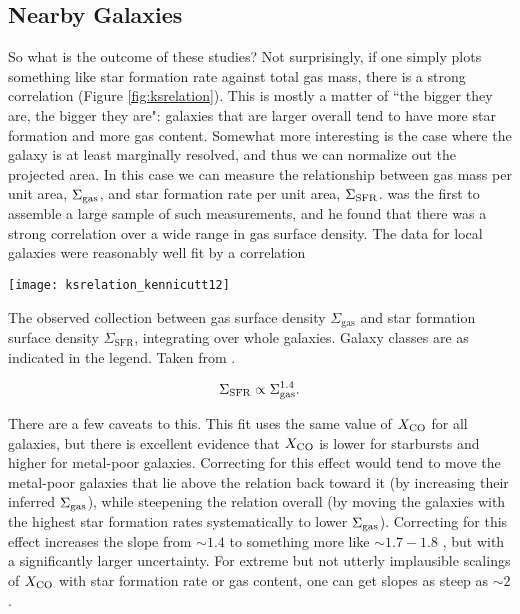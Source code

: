 \subsection{Nearby Galaxies}

So what is the outcome of these studies? Not surprisingly, if one simply plots something like star formation rate against total gas mass, there is a strong correlation (Figure \ref{fig:ksrelation}). This is mostly a matter of ``the bigger they are, the bigger they are": galaxies that are larger overall tend to have more star formation and more gas content. Somewhat more interesting is the case where the galaxy is at least marginally resolved, and thus we can normalize out the projected area. In this case we can measure the relationship between gas mass per unit area, $\Sigma_{\rm gas}$, and star formation rate per unit area, $\Sigma_{\rm SFR}$. \citet{kennicutt98a} was the first to assemble a large sample of such measurements, and he found that there was a strong correlation over a wide range in gas surface density. The data for local galaxies were reasonably well fit by a correlation
\begin{marginfigure}
\texttt{[image: ksrelation\_kennicutt12]}
\caption[Whole-galaxy Kennicutt-Schmidt relation]{
\label{fig:ksrelation}
The observed collection between gas surface density $\Sigma_{\mathrm{gas}}$ and star formation surface density $\Sigma_{\mathrm{SFR}}$, integrating over whole galaxies. Galaxy classes are as indicated in the legend. Taken from \citet{kennicutt12a}.
}
\end{marginfigure}

\begin{equation}
\Sigma_{\rm SFR} \propto \Sigma_{\rm gas}^{1.4}.
\end{equation}

There are a few caveats to this. This fit uses the same value of $X_{\rm CO}$ for all galaxies, but there is excellent evidence that $X_{\rm CO}$ is lower for starbursts and higher for metal-poor galaxies. Correcting for this effect would tend to move the metal-poor galaxies that lie above the relation back toward it (by increasing their inferred $\Sigma_{\rm gas}$), while steepening the relation overall (by moving the galaxies with the highest star formation rates systematically to lower $\Sigma_{\rm gas}$). Correcting for this effect increases the slope from $\sim 1.4$ to something more like $\sim 1.7-1.8$ \citep[e.g.,][]{narayanan12a}, but with a significantly larger uncertainty. For extreme but not utterly implausible scalings of $X_{\rm CO}$ with star formation rate or gas content, one can get slopes as steep as $\sim 2$.


